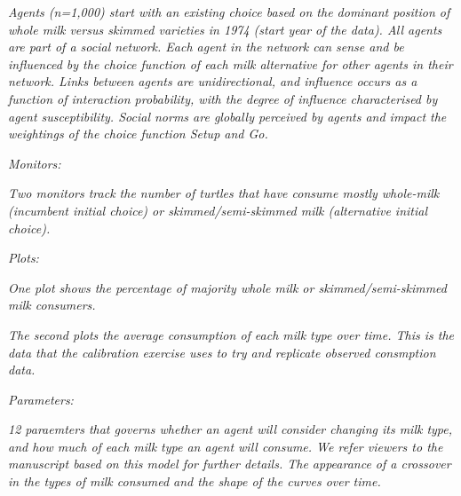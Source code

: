 \documentclass[preprint,12pt]{elsarticle}
\begin{document}
\begin{tcolorbox}
\textit{Agents (n=1,000) start with an existing choice based on the dominant position of whole milk versus skimmed varieties in 1974 (start year of the data). All agents are part of a social network. Each agent in the network can sense and be influenced by the choice function of each milk alternative for other agents in their network. Links between agents are unidirectional, and influence occurs as a function of interaction probability, with the degree of influence characterised by agent susceptibility. Social norms are globally perceived by agents and impact the weightings of the choice function
Setup and Go.}

\textit{Monitors:}

\textit{Two monitors track the number of turtles that have consume mostly whole-milk (incumbent initial choice) or skimmed/semi-skimmed milk (alternative initial choice).}

\textit{Plots:}

\textit{One plot shows the percentage of majority whole milk or skimmed/semi-skimmed milk consumers.}

\textit{The second plots the average consumption of each milk type over time. This is the data that the calibration exercise uses to try and replicate observed consmption data.}

\textit{Parameters:}

\textit{12 paraemters that governs whether an agent will consider changing its milk type, and how much of each milk type an agent will consume. We refer viewers to the manuscript based on this model for further details.
The appearance of a crossover in the types of milk consumed and the shape of the curves over time.}

\end{tcolorbox}

\newpage
\end{document}
